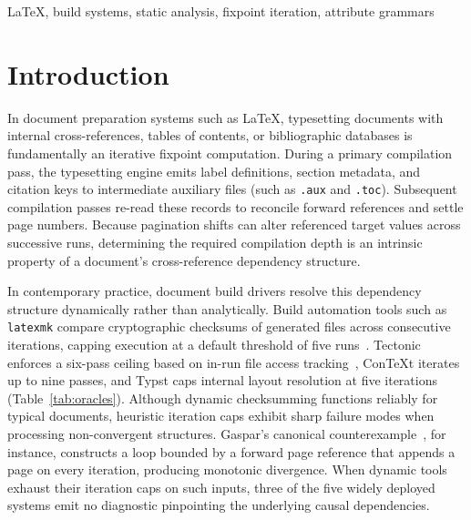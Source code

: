 \documentclass[conference]{IEEEtran}
\begin{document}
\begin{IEEEkeywords}
LaTeX, build systems, static analysis, fixpoint iteration, attribute grammars
\end{IEEEkeywords}

\section{Introduction}

In document preparation systems such as \LaTeX, typesetting documents with internal cross-references, tables of contents, or bibliographic databases is fundamentally an iterative fixpoint computation. During a primary compilation pass, the typesetting engine emits label definitions, section metadata, and citation keys to intermediate auxiliary files (such as \texttt{.aux} and \texttt{.toc}). Subsequent compilation passes re-read these records to reconcile forward references and settle page numbers. Because pagination shifts can alter referenced target values across successive runs, determining the required compilation depth is an intrinsic property of a document's cross-reference dependency structure.

In contemporary practice, document build drivers resolve this dependency structure dynamically rather than analytically. Build automation tools such as \texttt{latexmk} compare cryptographic checksums of generated files across consecutive iterations, capping execution at a default threshold of five runs~\cite{latexmk}. Tectonic enforces a six-pass ceiling based on in-run file access tracking~\cite{tectonic}, ConTeXt iterates up to nine passes, and Typst caps internal layout resolution at five iterations~\cite{typst} (Table~\ref{tab:oracles}). Although dynamic checksumming functions reliably for typical documents, heuristic iteration caps exhibit sharp failure modes when processing non-convergent structures. Gaspar's canonical counterexample~\cite{gaspar2014}, for instance, constructs a loop bounded by a forward page reference that appends a page on every iteration, producing monotonic divergence. When dynamic tools exhaust their iteration caps on such inputs, three of the five widely deployed systems emit no diagnostic pinpointing the underlying causal dependencies.
\end{document}
